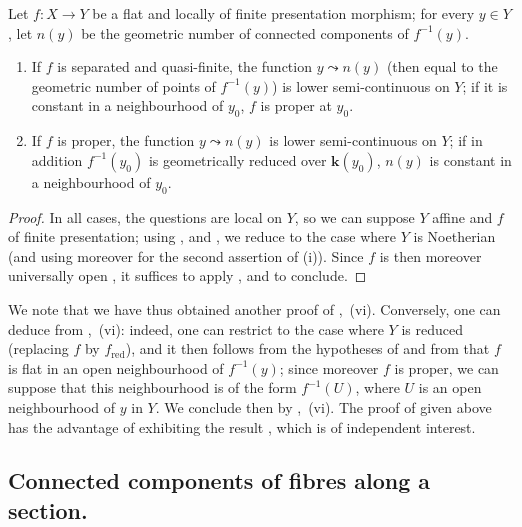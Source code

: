 
\begin{proposition}[15.5.9]
\label{IV.15.5.9}
Let $f:X\to Y$ be a flat and locally of finite presentation morphism; for every $y\in Y$, let $n(y)$ be the geometric number of connected components of $f^{-1}(y)$.
\begin{enumerate}[label=(\roman*)]
  \item If $f$ is separated and quasi-finite, the function $y\leadsto n(y)$ \textup{(then equal to the geometric number of points of $f^{-1}(y)$)} is lower semi-continuous on $Y$; if it is constant in a neighbourhood of $y_0$, $f$ is proper at $y_0$.
  \item If $f$ is proper, the function $y\leadsto n(y)$ is lower semi-continuous on $Y$; if in addition $f^{-1}(y_0)$ is geometrically reduced over $\boldsymbol{k}(y_0)$, $n(y)$ is constant in a neighbourhood of $y_0$.
\end{enumerate}
\end{proposition}

\begin{proof}
In all cases, the questions are local on $Y$, so we can suppose $Y$ affine and $f$ of finite presentation; using ,  and , we reduce to the case where $Y$ is Noetherian (and using moreover  for the second assertion of (i)).
Since $f$ is then moreover universally open , it suffices to apply ,  and  to conclude.
\end{proof}

\begin{remarks}[15.5.10]
\label{IV.15.5.10}
We note that we have thus obtained another proof of ,~(vi).
Conversely, one can deduce  from ,~(vi): indeed, one can restrict to the case where $Y$ is reduced (replacing $f$ by $f_\mathrm{red}$), and it then follows from the hypotheses of  and from  that $f$ is flat in an open neighbourhood of $f^{-1}(y)$; since moreover $f$ is proper, we can suppose that this neighbourhood is of the form $f^{-1}(U)$, where $U$ is an open neighbourhood of $y$ in $Y$.
We conclude then by ,~(vi).
The proof of  given above has the advantage of exhibiting the result , which is of independent interest.
\end{remarks}


\subsection{Connected components of fibres along a section.}
\label{subsection:IV.15.6}

